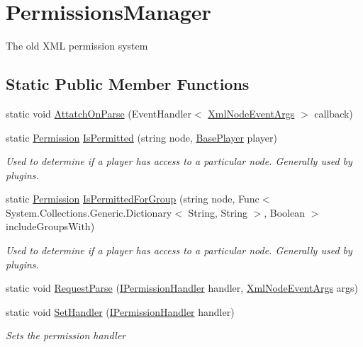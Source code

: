 \hypertarget{classOTA_1_1Permissions_1_1PermissionsManager}{}\section{Permissions\+Manager}
\label{classOTA_1_1Permissions_1_1PermissionsManager}


The old X\+M\+L permission system  


\subsection*{Static Public Member Functions}
\begin{DoxyCompactItemize}
\item 
static void \hyperlink{classOTA_1_1Permissions_1_1PermissionsManager_af749447d403d2a6cacbcd23e30e31f1a}{Attatch\+On\+Parse} (Event\+Handler$<$ \hyperlink{classOTA_1_1Permissions_1_1XmlNodeEventArgs}{Xml\+Node\+Event\+Args} $>$ callback)
\item 
static \hyperlink{namespaceOTA_1_1Permissions_a5335d23d62bc219ccbf40b018c002e8d}{Permission} \hyperlink{classOTA_1_1Permissions_1_1PermissionsManager_aea6304b830384f0be104f169632a0fa1}{Is\+Permitted} (string node, \hyperlink{classOTA_1_1BasePlayer}{Base\+Player} player)
\begin{DoxyCompactList}\small\item\em Used to determine if a player has access to a particular node. Generally used by plugins. \end{DoxyCompactList}\item 
static \hyperlink{namespaceOTA_1_1Permissions_a5335d23d62bc219ccbf40b018c002e8d}{Permission} \hyperlink{classOTA_1_1Permissions_1_1PermissionsManager_a7ace4e1d68e8ae76efda600c9ec5c528}{Is\+Permitted\+For\+Group} (string node, Func$<$ System.\+Collections.\+Generic.\+Dictionary$<$ String, String $>$, Boolean $>$ include\+Groups\+With)
\begin{DoxyCompactList}\small\item\em Used to determine if a player has access to a particular node. Generally used by plugins. \end{DoxyCompactList}\item 
static void \hyperlink{classOTA_1_1Permissions_1_1PermissionsManager_a8e67f861cd76e9a30a9f443a3fef7c74}{Request\+Parse} (\hyperlink{interfaceOTA_1_1Permissions_1_1IPermissionHandler}{I\+Permission\+Handler} handler, \hyperlink{classOTA_1_1Permissions_1_1XmlNodeEventArgs}{Xml\+Node\+Event\+Args} args)
\item 
static void \hyperlink{classOTA_1_1Permissions_1_1PermissionsManager_a7a58e36f8fdcb2e8737f860bd7277d86}{Set\+Handler} (\hyperlink{interfaceOTA_1_1Permissions_1_1IPermissionHandler}{I\+Permission\+Handler} handler)
\begin{DoxyCompactList}\small\item\em Sets the permission handler \end{DoxyCompactList}\end{DoxyCompactItemize}
